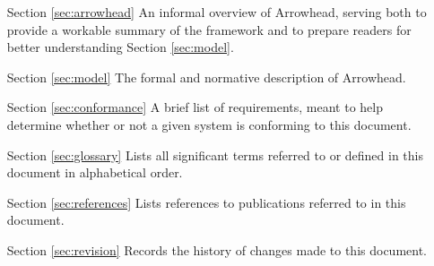 \begin{itemize}[leftmargin=3cm,rightmargin=0pt,labelwidth=2cm,labelsep=0pt,itemindent=0pt,parsep=0.1cm,topsep=0.1cm,align=left]


\item[Section \ref{sec:arrowhead}]
An informal overview of Arrowhead, serving both to provide a workable summary of the framework and to prepare readers for better understanding Section \ref{sec:model}.

\item[Section \ref{sec:model}]
The formal and normative description of Arrowhead.

\item[Section \ref{sec:conformance}]
A brief list of requirements, meant to help determine whether or not a given system is conforming to this document.

\item[Section \ref{sec:glossary}]
Lists all significant terms referred to or defined in this document in alphabetical order.

\item[Section \ref{sec:references}]
Lists references to publications referred to in this document.

\item[Section \ref{sec:revision}]
Records the history of changes made to this document.

\end{itemize}
